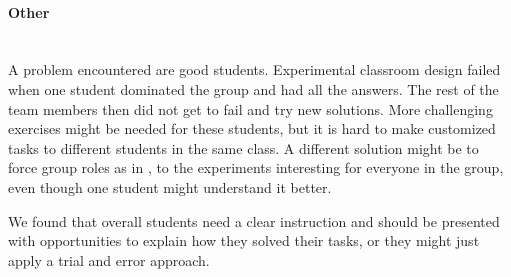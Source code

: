\paragraph{Other}~\\
A problem encountered are good students. Experimental classroom design failed when one student dominated the group and had all the answers. The rest of the team members then did not get to fail and try new solutions. More challenging exercises might be needed for these students, but it is hard to make customized tasks to different students in the same class. A different solution might be to force group roles as in \cite{mitnik2009collaborative}, to the experiments interesting for everyone in the group, even though one student might understand it better.

\bigskip\noindent
We found that overall students need a clear instruction and should be presented with opportunities to explain how they solved their tasks, or they might just apply a trial and error approach. 